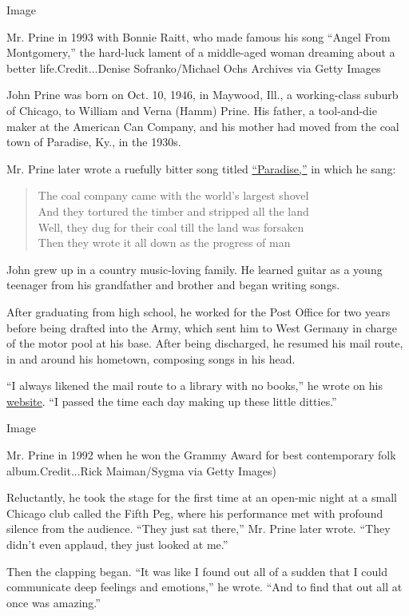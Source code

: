 Image

Mr. Prine in 1993 with Bonnie Raitt, who made famous his song ``Angel
From Montgomery,'' the hard-luck lament of a middle-aged woman dreaming
about a better life.Credit...Denise Sofranko/Michael Ochs Archives via
Getty Images

John Prine was born on Oct. 10, 1946, in Maywood, Ill., a working-class
suburb of Chicago, to William and Verna (Hamm) Prine. His father, a
tool-and-die maker at the American Can Company, and his mother had moved
from the coal town of Paradise, Ky., in the 1930s.

Mr. Prine later wrote a ruefully bitter song titled
\href{https://www.youtube.com/watch?v=ediaZ5DhYjw}{``Paradise,''} in
which he sang:

\begin{quote}
The coal company came with the world's largest shovel\\
And they tortured the timber and stripped all the land\\
Well, they dug for their coal till the land was forsaken\\
Then they wrote it all down as the progress of man
\end{quote}

John grew up in a country music-loving family. He learned guitar as a
young teenager from his grandfather and brother and began writing songs.

After graduating from high school, he worked for the Post Office for two
years before being drafted into the Army, which sent him to West Germany
in charge of the motor pool at his base. After being discharged, he
resumed his mail route, in and around his hometown, composing songs in
his head.

``I always likened the mail route to a library with no books,'' he wrote
on his \href{http://johnprine.net/}{website}. ``I passed the time each
day making up these little ditties.''

Image

Mr. Prine in 1992 when he won the Grammy Award for best contemporary
folk album.Credit...Rick Maiman/Sygma via Getty Images)

Reluctantly, he took the stage for the first time at an open-mic night
at a small Chicago club called the Fifth Peg, where his performance met
with profound silence from the audience. ``They just sat there,'' Mr.
Prine later wrote. ``They didn't even applaud, they just looked at me.''

Then the clapping began. ``It was like I found out all of a sudden that
I could communicate deep feelings and emotions,'' he wrote. ``And to
find that out all at once was amazing.''


